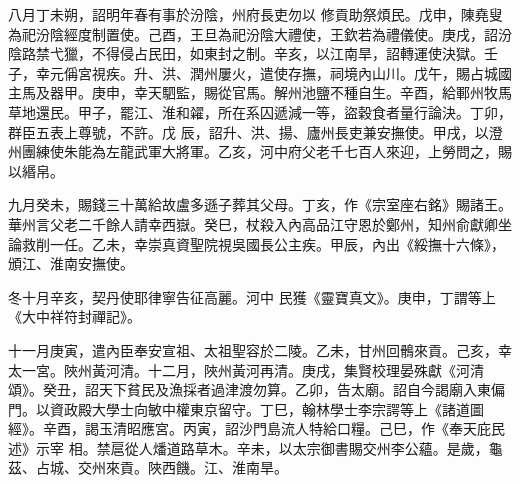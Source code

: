 \begin{pinyinscope}
 八月丁未朔，詔明年春有事於汾陰，州府長吏勿以
 修貢助祭煩民。戊申，陳堯叟為祀汾陰經度制置使。己酉，王旦為祀汾陰大禮使，王欽若為禮儀使。庚戌，詔汾陰路禁弋獵，不得侵占民田，如東封之制。辛亥，以江南旱，詔轉運使決獄。壬子，幸元偁宮視疾。升、洪、潤州屢火，遣使存撫，祠境內山川。戊午，賜占城國主馬及器甲。庚申，幸天駟監，賜從官馬。解州池鹽不種自生。辛酉，給鄆州牧馬草地還民。甲子，罷江、淮和糴，所在系囚遞減一等，盜穀食者量行論決。丁卯，群臣五表上尊號，不許。戊
 辰，詔升、洪、揚、廬州長吏兼安撫使。甲戌，以澄州團練使朱能為左龍武軍大將軍。乙亥，河中府父老千七百人來迎，上勞問之，賜以緡帛。



 九月癸未，賜錢三十萬給故盧多遜子葬其父母。丁亥，作《宗室座右銘》賜諸王。華州言父老二千餘人請幸西嶽。癸巳，杖殺入內高品江守恩於鄭州，知州俞獻卿坐論救削一任。乙未，幸崇真資聖院視吳國長公主疾。甲辰，內出《綏撫十六條》，頒江、淮南安撫使。



 冬十月辛亥，契丹使耶律寧告征高麗。河中
 民獲《靈寶真文》。庚申，丁謂等上《大中祥符封禪記》。



 十一月庚寅，遣內臣奉安宣祖、太祖聖容於二陵。乙未，甘州回鶻來貢。己亥，幸太一宮。陜州黃河清。十二月，陜州黃河再清。庚戌，集賢校理晏殊獻《河清頌》。癸丑，詔天下貧民及漁採者過津渡勿算。乙卯，告太廟。詔自今謁廟入東偏門。以資政殿大學士向敏中權東京留守。丁巳，翰林學士李宗諤等上《諸道圖經》。辛酉，謁玉清昭應宮。丙寅，詔沙門島流人特給口糧。己巳，作《奉天庇民述》示宰
 相。禁扈從人燔道路草木。辛未，以太宗御書賜交州李公蘊。是歲，龜茲、占城、交州來貢。陜西饑。江、淮南旱。



\end{pinyinscope}